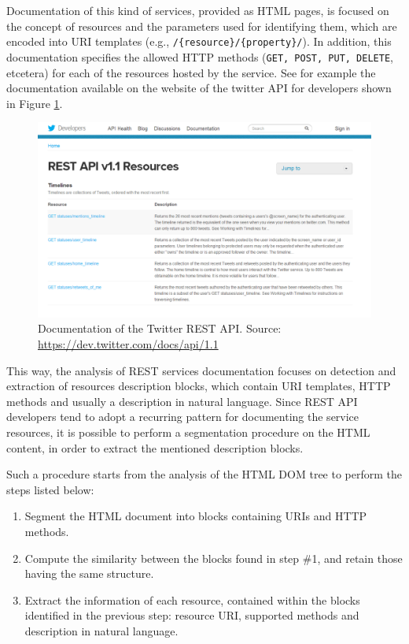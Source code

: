 Documentation of this kind of services, provided as HTML pages, is focused on the concept of resources and the parameters used for identifying them, which are encoded into URI templates (e.g., \texttt{/\{resource\}/\{property\}/}). In addition, this documentation specifies the allowed HTTP methods
(\texttt{GET, POST, PUT, DELETE}, etcetera) for each of the resources hosted by the service. See for example the documentation available on the website of the twitter API for developers shown in Figure \ref{twitter-rest-api}.

\begin{figure}
\includegraphics[scale=0.33]{images/twitter-rest-api}

\caption{Documentation of the Twitter REST API.{\scriptsize{} Source: \protect\href{https://dev.twitter.com/docs/api/1.1}{https://dev.twitter.com/docs/api/1.1}}}
\label{twitter-rest-api}

\end{figure}

This way, the analysis of REST services documentation focuses on detection and extraction of resources description blocks, which contain URI templates, HTTP methods and usually a description in natural language. Since REST API developers tend to adopt a recurring pattern for documenting
the service resources, it is possible to perform a segmentation procedure on the HTML content, in order to extract the mentioned description blocks. 

Such a procedure starts from the analysis of the HTML DOM tree to perform the steps listed below:

\begin{enumerate}
 \item Segment the HTML document into blocks containing URIs and HTTP methods. 
 \item Compute the similarity between the blocks found in step \#1, and retain those having the same structure.
 \item Extract the information of each resource, contained within the blocks identified in the previous step: resource URI, supported methods and description in natural language.
\end{enumerate}

